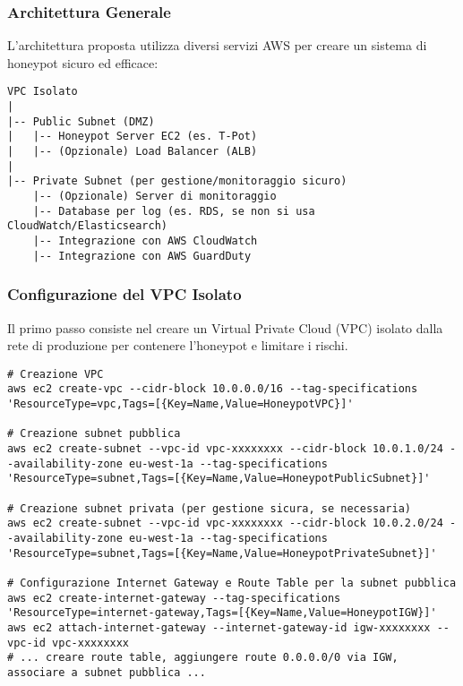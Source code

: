 \subsubsection{Architettura Generale}
\label{subsubsec:architettura}

L'architettura proposta utilizza diversi servizi AWS per creare un sistema di honeypot sicuro ed efficace:

\begin{verbatim}
VPC Isolato
|
|-- Public Subnet (DMZ)
|   |-- Honeypot Server EC2 (es. T-Pot)
|   |-- (Opzionale) Load Balancer (ALB)
|
|-- Private Subnet (per gestione/monitoraggio sicuro)
    |-- (Opzionale) Server di monitoraggio
    |-- Database per log (es. RDS, se non si usa CloudWatch/Elasticsearch)
    |-- Integrazione con AWS CloudWatch
    |-- Integrazione con AWS GuardDuty
\end{verbatim}

\subsubsection{Configurazione del VPC Isolato}
\label{subsubsec:config_vpc}

Il primo passo consiste nel creare un Virtual Private Cloud (VPC) isolato dalla rete di produzione per contenere l'honeypot e limitare i rischi.

\begin{lstlisting}[caption={Comandi AWS CLI (esemplificativi) per la creazione di un VPC isolato}, label=lst:vpc_setup]
# Creazione VPC
aws ec2 create-vpc --cidr-block 10.0.0.0/16 --tag-specifications 'ResourceType=vpc,Tags=[{Key=Name,Value=HoneypotVPC}]'

# Creazione subnet pubblica
aws ec2 create-subnet --vpc-id vpc-xxxxxxxx --cidr-block 10.0.1.0/24 --availability-zone eu-west-1a --tag-specifications 'ResourceType=subnet,Tags=[{Key=Name,Value=HoneypotPublicSubnet}]'

# Creazione subnet privata (per gestione sicura, se necessaria)
aws ec2 create-subnet --vpc-id vpc-xxxxxxxx --cidr-block 10.0.2.0/24 --availability-zone eu-west-1a --tag-specifications 'ResourceType=subnet,Tags=[{Key=Name,Value=HoneypotPrivateSubnet}]'

# Configurazione Internet Gateway e Route Table per la subnet pubblica
aws ec2 create-internet-gateway --tag-specifications 'ResourceType=internet-gateway,Tags=[{Key=Name,Value=HoneypotIGW}]'
aws ec2 attach-internet-gateway --internet-gateway-id igw-xxxxxxxx --vpc-id vpc-xxxxxxxx
# ... creare route table, aggiungere route 0.0.0.0/0 via IGW, associare a subnet pubblica ...
\end{lstlisting}

